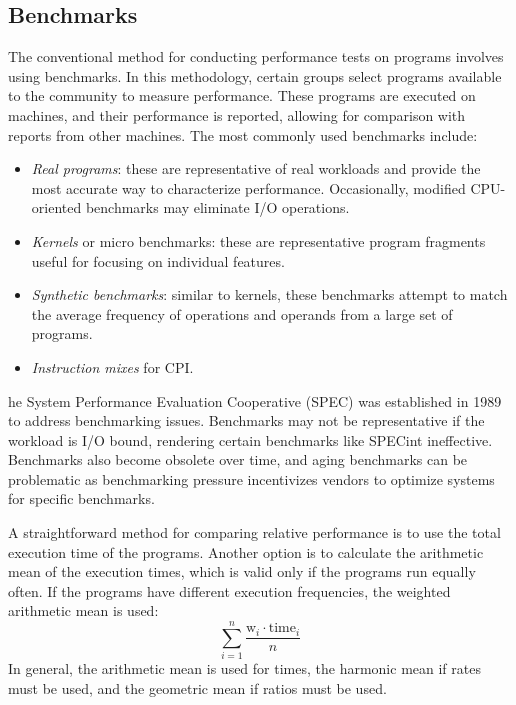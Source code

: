 \subsection{Benchmarks}
The conventional method for conducting performance tests on programs involves using benchmarks. 
In this methodology, certain groups select programs available to the community to measure performance. 
These programs are executed on machines, and their performance is reported, allowing for comparison with reports from other machines. 
The most commonly used benchmarks include:
\begin{itemize}
    \item \textit{Real programs}: these are representative of real workloads and provide the most accurate way to characterize performance. 
        Occasionally, modified CPU-oriented benchmarks may eliminate I/O operations.
    \item \textit{Kernels} or micro benchmarks: these are representative program fragments useful for focusing on individual features.
    \item \textit{Synthetic benchmarks}: similar to kernels, these benchmarks attempt to match the average frequency of operations and operands from a large set of programs.
    \item \textit{Instruction mixes} for CPI. 
\end{itemize}
he System Performance Evaluation Cooperative (SPEC) was established in 1989 to address benchmarking issues.
Benchmarks may not be representative if the workload is I/O bound, rendering certain benchmarks like SPECint ineffective. 
Benchmarks also become obsolete over time, and aging benchmarks can be problematic as benchmarking pressure incentivizes vendors to optimize systems for specific benchmarks.

A straightforward method for comparing relative performance is to use the total execution time of the programs. 
Another option is to calculate the arithmetic mean of the execution times, which is valid only if the programs run equally often. 
If the programs have different execution frequencies, the weighted arithmetic mean is used:
\[\sum_{i=1}^{n} \dfrac{\text{w}_i \cdot \text{time}_i}{n}\]
In general, the arithmetic mean is used for times, the harmonic mean if rates must be used, and the geometric mean if ratios must be used.